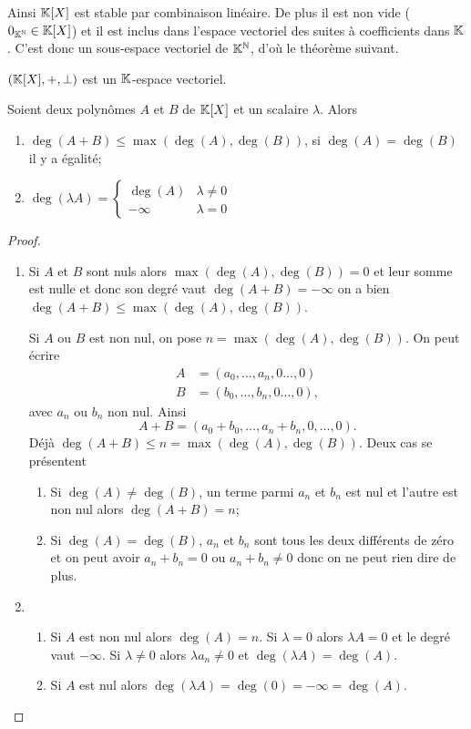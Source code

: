 Ainsi $\mathbb{K}[X]$ est stable par combinaison linéaire. De plus il est non vide ($0_{\mathbb{K}^{\mathbb{N}}} \in \mathbb{K}[X]$) et il est inclus dans l'espace vectoriel des suites à coefficients dans $\mathbb{K}$. C'est donc un sous-espace vectoriel de $\mathbb{K}^{\mathbb{N}}$, d'où le théorème suivant.

\begin{theo}
  $(\mathbb{K}[X], +, \perp)$ est un $\mathbb{K}$-espace vectoriel.
\end{theo}

\begin{prop}
  Soient deux polynômes $A$ et $B$ de $\mathbb{K}[X]$ et un scalaire $\lambda$. Alors
  \begin{enumerate}
  \item $\deg(A+B) \leq \max(\deg(A),\deg(B))$, si $\deg(A)=\deg(B)$ il y a égalité;
  \item $\deg(\lambda A) = \begin{cases} \deg(A) & \lambda \neq 0 \\ -\infty & \lambda =0 \end{cases}$
  \end{enumerate}
\end{prop}
\begin{proof}
  \begin{enumerate}
  \item Si $A$ et $B$ sont nuls alors $\max(\deg(A),\deg(B))=0$ et leur somme est nulle et donc son degré vaut $\deg(A+B)=-\infty$ on a bien $\deg(A+B) \leq \max(\deg(A),\deg(B))$. 

    Si $A$ ou $B$ est non nul, on pose $n=\max(\deg(A),\deg(B))$. On peut écrire
    \begin{align}
      A &= (a_0, \ldots, a_n, 0 \ldots, 0) \\
      B &= (b_0, \ldots, b_n, 0 \ldots, 0),
    \end{align}
    avec $a_n$ ou $b_n$ non nul. Ainsi
    \begin{equation}
      A+B = (a_0+b_0, \ldots, a_n+b_n, 0, \ldots, 0).
    \end{equation}
    Déjà $\deg(A+B) \leq n = \max(\deg(A),\deg(B))$. Deux cas se présentent
    \begin{enumerate}
    \item Si $\deg(A) \neq \deg(B)$, un terme parmi $a_n$ et $b_n$ est nul et l'autre est non nul alors $\deg(A+B)=n$;
    \item Si $\deg(A) = \deg(B)$, $a_n$ et $b_n$ sont tous les deux différents de zéro et on peut avoir $a_n+b_n=0$ ou $a_n+b_n \neq 0$ donc on ne peut rien dire de plus.
    \end{enumerate}
  \item
    \begin{enumerate}
    \item Si $A$ est non nul alors $\deg(A)=n$. Si $\lambda=0$ alors $\lambda A=0$ et le degré vaut $-\infty$. Si $\lambda \neq 0$ alors $\lambda a_n \neq 0$ et $\deg(\lambda A)=\deg(A)$.
    \item Si $A$ est nul alors $\deg(\lambda A)=\deg(0)=-\infty=\deg(A)$.
    \end{enumerate}
  \end{enumerate}
\end{proof}

